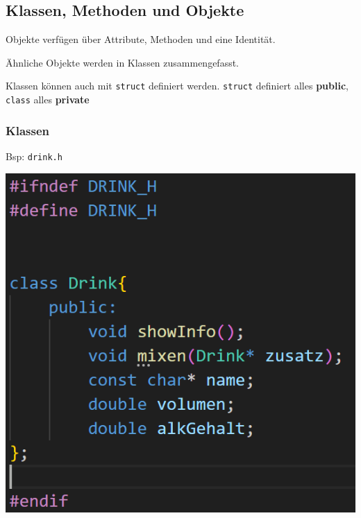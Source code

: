     \subsection{Klassen, Methoden und Objekte}
        Objekte verfügen über Attribute, Methoden und eine Identität.

        Ähnliche Objekte werden in Klassen zusammengefasst.

        Klassen können auch mit \verb|struct| definiert werden. \verb|struct| definiert alles \textbf{public}, \verb|class| alles \textbf{private}

        \subsubsection{Klassen}
            Bsp: \verb|drink.h| \\ %
            \begin{minipage}{0.45\linewidth}
                \includegraphics[width=0.95\linewidth]{Bilder/cpp_klassen-hfile-bsp.png}
            \end{minipage}
            \hfill
